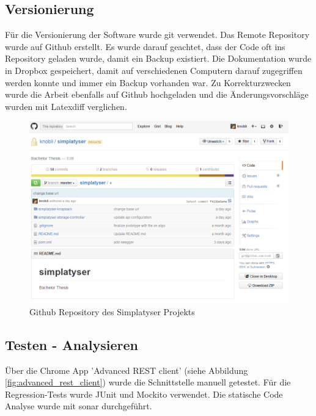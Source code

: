 \newpage

\subsection{Versionierung}
Für die Versionierung der Software wurde git \cite{git} verwendet. Das Remote Repository wurde auf Github \cite{github_simplatyzer} erstellt. Es wurde darauf geachtet, dass 
der Code oft ins Repository geladen wurde, damit ein Backup existiert. Die Dokumentation wurde in Dropbox \cite{dropbox} gespeichert, damit auf verschiedenen Computern darauf 
zugegriffen werden konnte und immer ein Backup vorhanden war. Zu Korrekturzwecken wurde die Arbeit ebenfalls auf Github hochgeladen und die Änderungsvorschläge wurden mit Latexdiff 
\cite{latexdiff} verglichen.

\begin{figure}[h]
\centering
\includegraphics[scale=0.6]{images/github.png}
\caption[Github Repository des Simplatyser Projekts]{Github Repository des Simplatyser Projekts \selfmade{}}
\label{fig:github_repo}
\end{figure}

\FloatBarrier
\newpage

\subsection{Testen - Analysieren}
Über die Chrome App 'Advanced REST client' \cite{advanced_rest_client} (siehe Abbildung \ref{fig:advanced_rest_client})  wurde die Schnittstelle manuell getestet. Für die Regression-Tests 
wurde JUnit \cite{junit} und Mockito \cite{mockito} verwendet. Die statische Code Analyse wurde mit \gls{sonar} \cite{sonar} durchgeführt.

